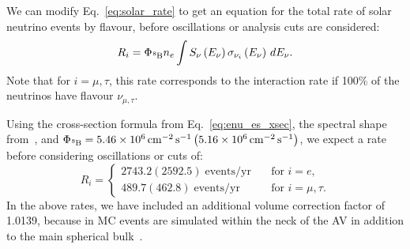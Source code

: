 We can modify Eq.~\ref{eq:solar_rate} to get an equation for the total rate of solar neutrino events by flavour, before oscillations or analysis cuts are considered:\
\begin{equation}
    R_{i} = \Phi_{\beight{}}n_{e}
                \int S_{\nu}\left(E_{\nu}\right)\sigma_{\nu_{i}}\left(E_{\nu}\right)\,dE_{\nu}.
\end{equation}
Note that for $i=\mu,\tau$, this rate corresponds to the interaction rate if 100\% of the neutrinos have flavour $\nu_{\mu,\tau}$.

Using the cross-section formula from Eq.~\ref{eq:enu_es_xsec}, the \beight{} spectral shape from~\cite{winterB8NeutrinoSpectrum2006}, and $\Phi_{\beight{}} = \SI{5.46e6}{\per\cm\squared\per\second} \left(\SI{5.16e6}{\per\cm\squared\per\second}\right)$, we expect a rate before considering oscillations or cuts of:
\begin{equation*}
    R_{i} = 
    \begin{cases}
        2743.2 (2592.5)\; \text{events/yr} & \quad \text{for } i = e,\\
        489.7 (462.8)\;  \text{events/yr} & \quad \text{for } i = \mu,\tau.
    \end{cases}
\end{equation*}
In the above rates, we have included an additional volume correction factor of 1.0139, because in MC events are simulated within the neck of the AV in addition to the main spherical bulk~\cite{caravacaValidationSNOProduction2019}. %

